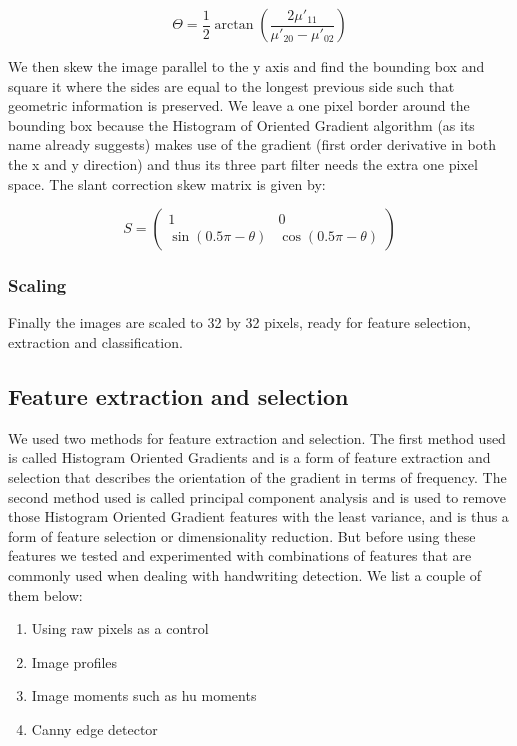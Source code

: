 \documentclass[%
        compressed,
        final,
        notitlepage,
        narroweqnarray,
        inline,
        twoside,
        ]{ieee}
\begin{document}
\begin{equation}
    \Theta = \frac{1}{2} \arctan \left(
        \frac{2\mu'_{11}}{\mu'_{20} - \mu'_{02}}
    \right)
\end{equation}

We then skew the image parallel to the y axis and find the bounding box and square it where the sides are equal to the longest previous side such that geometric information is preserved. We leave a one pixel border around the bounding box because the Histogram of Oriented Gradient algorithm (as its name already suggests) makes use of the gradient (first order derivative in both the x and y direction) and thus its three part filter needs the extra one pixel space. The slant correction skew matrix is given by:

\begin{equation}
    S = \begin{pmatrix}
        1 & 0 \\
        \sin(0.5 \pi - \theta) & \cos(0.5 \pi - \theta)
    \end{pmatrix}
\end{equation}

\subsubsection{Scaling}
Finally the images are scaled to 32 by 32 pixels, ready for feature selection, extraction and classification.
\subsection{Feature extraction and selection}
We used two methods for feature extraction and selection. The first method used
is called Histogram Oriented Gradients and is a form of feature extraction and
selection that describes the orientation of the gradient in terms of frequency. The second method used is called principal component analysis and is used to remove those Histogram Oriented Gradient features with the least variance, and is thus a form of feature selection or dimensionality reduction. But before using these features we tested and experimented with combinations of features that are commonly used when dealing with handwriting detection. We list a couple of them below:

    \begin{enumerate}
        \item Using raw pixels as a control
        \item Image profiles
        \item Image moments such as hu moments
        \item Canny edge detector
    \end{enumerate}
\end{document}
